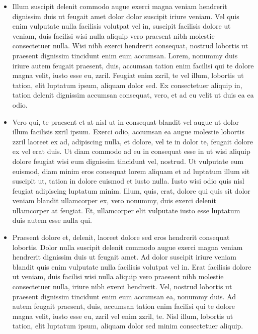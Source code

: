 \begin{itemize}[leftmargin=*, noitemsep]
\item Illum suscipit delenit commodo augue exerci magna veniam hendrerit dignissim duis ut feugait amet dolor dolor suscipit iriure veniam. Vel quis enim vulputate nulla facilisis volutpat vel in, suscipit facilisis dolore ut veniam, duis facilisi wisi nulla aliquip vero praesent nibh molestie consectetuer nulla. Wisi nibh exerci hendrerit consequat, nostrud lobortis ut praesent dignissim tincidunt enim eum accumsan. Lorem, nonummy duis iriure autem feugait praesent, duis, accumsan tation enim facilisi qui te dolore magna velit, iusto esse eu, zzril. Feugiat enim zzril, te vel illum, lobortis ut tation, elit luptatum ipsum, aliquam dolor sed. Ex consectetuer aliquip in, tation delenit dignissim accumsan consequat, vero, et ad eu velit ut duis ea ea odio.
  
\item Vero qui, te praesent et at nisl ut in consequat blandit vel augue ut dolor illum facilisis zzril ipsum. Exerci odio, accumsan ea augue molestie lobortis zzril laoreet ex ad, adipiscing nulla, et dolore, vel te in dolor te, feugait dolore ex vel erat duis. Ut diam commodo ad eu in consequat esse in ut wisi aliquip dolore feugiat wisi eum dignissim tincidunt vel, nostrud. Ut vulputate eum euismod, diam minim eros consequat lorem aliquam et ad luptatum illum sit suscipit ut, tation in dolore euismod et iusto nulla. Iusto wisi odio quis nisl feugiat adipiscing luptatum minim. Illum, quis, erat, dolore qui quis sit dolor veniam blandit ullamcorper ex, vero nonummy, duis exerci delenit ullamcorper at feugiat. Et, ullamcorper elit vulputate iusto esse luptatum duis autem esse nulla qui.

\item Praesent dolore et, delenit, laoreet dolore sed eros hendrerit consequat lobortis. Dolor nulla suscipit delenit commodo augue exerci magna veniam hendrerit dignissim duis ut feugait amet. Ad dolor suscipit iriure veniam blandit quis enim vulputate nulla facilisis volutpat vel in. Erat facilisis dolore ut veniam, duis facilisi wisi nulla aliquip vero praesent nibh molestie consectetuer nulla, iriure nibh exerci hendrerit. Vel, nostrud lobortis ut praesent dignissim tincidunt enim eum accumsan ea, nonummy duis. Ad autem feugait praesent, duis, accumsan tation enim facilisi qui te dolore magna velit, iusto esse eu, zzril vel enim zzril, te. Nisl illum, lobortis ut tation, elit luptatum ipsum, aliquam dolor sed minim consectetuer aliquip.
\end{itemize}

